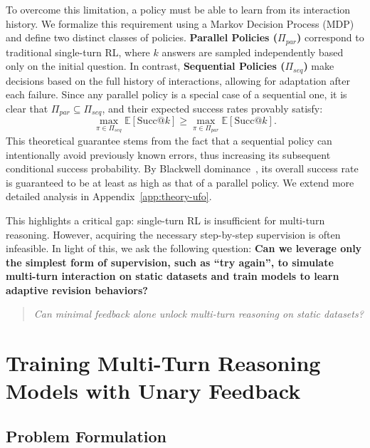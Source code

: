 To overcome this limitation, a policy must be able to learn from its interaction history. We formalize this requirement using a Markov Decision Process (MDP) and define two distinct classes of policies. \textbf{Parallel Policies ($\Pi_{par}$)} correspond to traditional single-turn RL, where $k$ answers are sampled independently based only on the initial question. In contrast, \textbf{Sequential Policies ($\Pi_{seq}$)} make decisions based on the full history of interactions, allowing for adaptation after each failure. Since any parallel policy is a special case of a sequential one, it is clear that $\Pi_{par} \subseteq \Pi_{seq}$, and their expected success rates provably satisfy:
\begin{equation}
    \max_{\pi \in \Pi_{seq}} \mathbb{E}[\text{Succ@}k] \ge \max_{\pi \in \Pi_{par}} \mathbb{E}[\text{Succ@}k].
\end{equation}
This theoretical guarantee stems from the fact that a sequential policy can intentionally avoid previously known errors, thus increasing its subsequent conditional success probability. By Blackwell dominance~\citep{Blackwell1951}, its overall success rate is guaranteed to be at least as high as that of a parallel policy. We extend more detailed analysis in Appendix~\ref{app:theory-ufo}.

This highlights a critical gap: single-turn RL is insufficient for multi-turn reasoning. However, acquiring the necessary step-by-step supervision is often infeasible. In light of this, we ask the following question: \textbf{Can we leverage only the simplest form of supervision, such as “try again”, to simulate multi-turn interaction on static datasets and train models to learn adaptive revision behaviors?}
\begin{quote}
    \emph{Can minimal feedback alone unlock multi-turn reasoning on static datasets?}
\end{quote}

\section{Training Multi-Turn Reasoning Models with Unary Feedback}
\subsection{Problem Formulation}

